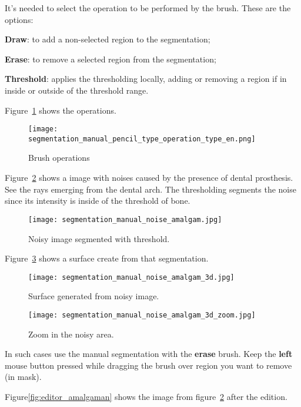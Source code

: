 It's needed to select the operation to be performed by the brush. These are the options:

\textbf{Draw}: to add a non-selected region to the segmentation;

\textbf{Erase}: to remove a selected region from the segmentation;

\textbf{Threshold}: applies the thresholding locally, adding or removing a
region if in inside or outside of the threshold range.

Figure~\ref{fig:select_brush_operations} shows the operations.

\begin{figure}[!htb]
\centering
\texttt{[image: segmentation\_manual\_pencil\_type\_operation\_type\_en.png]}
\caption{Brush operations}
\label{fig:select_brush_operations}
\end{figure}

Figure~\ref{fig:noise_amalgaman} shows a image with noises caused by the presence of dental prosthesis. See the rays emerging from the dental arch. The thresholding segments the noise since its intensity is inside of the threshold of bone.

\begin{figure}[!htb]
\centering
\texttt{[image: segmentation\_manual\_noise\_amalgam.jpg]}
\caption{Noisy image segmented with threshold.}
\label{fig:noise_amalgaman}
\end{figure}

Figure~\ref{fig:surface_amagaman} shows a surface create from that segmentation.

\begin{figure}[!htb]
\centering
\texttt{[image: segmentation\_manual\_noise\_amalgam\_3d.jpg]}
\caption{Surface generated from noisy image.}
\label{fig:surface_amagaman}
\end{figure}

\begin{figure}[!htb]
\centering
\texttt{[image: segmentation\_manual\_noise\_amalgam\_3d\_zoom.jpg]}
\caption{Zoom in the noisy area.}
\label{fig:surface_amagaman_zoom}
\end{figure}

In such cases use the manual segmentation with the \textbf{erase} brush. Keep the \textbf{left} mouse button pressed while dragging the brush over region you want to remove (in mask).

Figure\ref{fig:editor_amalgaman} shows the image from figure~\ref{fig:noise_amalgaman} after the edition.

